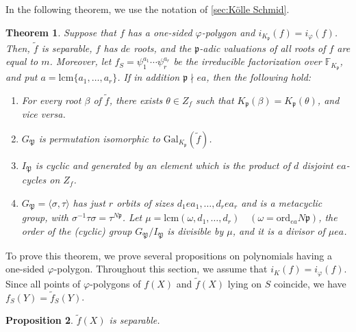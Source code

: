 \documentclass[10pt,a4paper]{amsart}
\newcommand{\field}[1]{\mathbb{#1}}
\newcommand{\Gal}{\mathrm{Gal}}
\newtheorem{theorem}{Theorem}[section]
\newtheorem{proposition}[theorem]{Proposition}
\numberwithin{equation}{section}
\begin{document}
  In the following theorem, we use the notation of \cref{sec:Kölle Schmid}. 


  \begin{theorem}\label{thm:our main theorem}
      Suppose that $f$ has a one-sided $\varphi$-polygon and $i_{K_{\mathfrak{p}}}(f) = i_{\varphi}(f)$. 
      Then, $\tilde{f}$ is separable, $f$ has $de$ roots, and the $\mathfrak{p}$-adic valuations of all roots of $f$ are equal to $m$. 
      Moreover, let $f_S = \psi_1^{a_1} \cdots \psi_r^{a_r}$ be the irreducible factorization over $\field{F}_{K_{\mathfrak{p}}}$, 
      and put $a = \mathrm{lcm}\{a_1, \dots ,a_r\}$. 
      If in addition $\mathfrak{p} \nmid ea$, then the following hold:
      \begin{enumerate}
        \item For every root $\beta$ of $\tilde{f}$, there exists $\theta \in Z_f$ such that $K_{\mathfrak{p}}(\beta) = K_{\mathfrak{p}}(\theta)$, and vice versa. 
        \item $G_{\mathfrak{P}}$ is permutation isomorphic to $\Gal_{K_\mathfrak{p}}(\tilde{f})$. 
        \item $I_{\mathfrak{P}}$ is cyclic and generated by an element which is the product of $d$ disjoint $ea$-cycles on $Z_f$. 
        \item $G_{\mathfrak{P}} = \langle \sigma,\tau \rangle$ has just $r$ orbits of sizes $d_1 ea_1, \dots ,d_r ea_r$ 
          and is a metacyclic group, with $\sigma^{-1}\tau\sigma = \tau^{N\mathfrak{p}}$. 
          Let $\mu = \mathrm{lcm}(\omega,d_1, \dots ,d_r) \quad (\omega = \mathrm{ord}_{ea} N\mathfrak{p})$, the order of the (cyclic) group $G_{\mathfrak{P}}/I_{\mathfrak{P}}$ 
          is divisible by $\mu$, and it is a divisor of $\mu ea$. 
      \end{enumerate}
    \end{theorem}


  To prove this theorem, we prove several propositions on polynomials having a one-sided $\varphi$-polygon. 
  Throughout this section, we assume that $i_K(f) = i_{\varphi}(f)$. 
  Since all points of $\varphi$-polygons of $f(X)$ and $\tilde{f}(X)$ lying on $S$ coincide, 
  we have $f_S(Y) = \tilde{f}_S(Y)$. 

  \begin{proposition}\label{prop:claim 2}
    $\tilde{f}(X)$ is separable. 
  \end{proposition}
\end{document}
